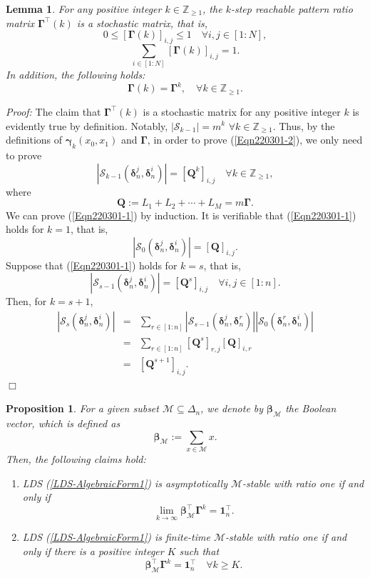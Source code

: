 \documentclass[11pt,onecolumn]{article}
\newtheorem{proposition}{Proposition}
\newtheorem{lemma}{Lemma}
\newcommand{\ddelta}{{\boldsymbol\delta}}
\begin{document}
\begin{lemma}\label{Lemma220301-1}
For any positive integer $k\in\mathbb Z_{\geq1}$, the $k$-step reachable pattern ratio matrix $\boldsymbol\Gamma^\top(k)$ is a stochastic matrix, that is, \[0\leq[\boldsymbol\Gamma(k)]_{i,j}\leq1\quad\forall i,j\in[1:N],\]
 \[\sum_{i\in[1:N]}[\boldsymbol\Gamma(k)]_{i,j}=1.\]
 In addition, the following holds:
 \begin{equation}\label{Eqn220301-2}
    \boldsymbol\Gamma(k)=\boldsymbol\Gamma^k,\quad\forall k\in\mathbb Z_{\geq1}.
 \end{equation}


\end{lemma}


{\it Proof:} The claim that $\boldsymbol\Gamma^\top(k)$ is a stochastic matrix for any positive integer $k$ is evidently true by definition. Notably, $|\mathcal S_{k-1} |=m^k$ $\forall k\in\mathbb Z_{\geq 1}$. Thus, by the definitions of $\boldsymbol\gamma_k(x_0,x_1)$ and $\boldsymbol\Gamma$, in order to prove (\ref{Eqn220301-2}), we only need to prove
\begin{equation}\label{Eqn220301-1}
   |\mathcal S_{k-1}(\ddelta_n^j,\ddelta_n^i)|=[\mathbf Q^k]_{i,j}\quad\forall k\in\mathbb Z_{\geq1},
\end{equation}
where \[\mathbf Q:=L_1+L_2+\cdots+L_M=m\boldsymbol\Gamma.\]
We can prove (\ref{Eqn220301-1}) by induction.
 It is verifiable that (\ref{Eqn220301-1}) holds for $k=1$, that is,
\[|\mathcal S_0(\ddelta_n^j,\ddelta_n^i)|=[\mathbf Q]_{i,j}.\]
Suppose that (\ref{Eqn220301-1}) holds for $k=s$, that is,
\[|\mathcal S_{s-1}(\ddelta_n^j,\ddelta_n^i)|=[\mathbf Q^s]_{i,j}\quad\forall i,j\in[1:n].\]
Then, for $k=s+1$,
\begin{eqnarray*}
  |\mathcal S_{s}(\ddelta_n^j,\ddelta_n^i)|
   &=& \sum_{r\in[1:n]}|\mathcal S_{s-1}(\ddelta_n^j,\ddelta_n^r)|   |\mathcal S_0(\ddelta_n^r,\ddelta_n^i)|\\
   &=&\sum_{r\in[1:n]} [\mathbf Q^s]_{r,j}[\mathbf Q]_{i,r}\\
   &=&[\mathbf Q^{s+1}]_{i,j}.
\end{eqnarray*}
\hfill $\Box$

\begin{proposition}For a given subset $\mathcal M\subseteq\Delta_n$, we denote by $\boldsymbol\beta_{\mathcal M}$ the Boolean vector, which is defined as
\[\boldsymbol\beta_{\mathcal M}:=\sum_{x\in\mathcal M}x.\]
Then, the following claims hold:
\begin{enumerate}
  \item  LDS (\ref{LDS-AlgebraicForm1}) is asymptotically $\mathcal M$-stable with ratio one if and only if
      \[\lim_{k\rightarrow\infty} \boldsymbol\beta_{\mathcal M}^\top\boldsymbol\Gamma^k=\mathbf 1_n^\top.\]
   \item  LDS (\ref{LDS-AlgebraicForm1}) is finite-time $\mathcal M$-stable with ratio one if and only if there is a positive integer $K$ such that
             \[  \boldsymbol\beta_{\mathcal M}^\top\boldsymbol\Gamma^k=\mathbf 1_n^\top\quad\forall k\geq K.\]
\end{enumerate}
\end{proposition}
\end{document}
